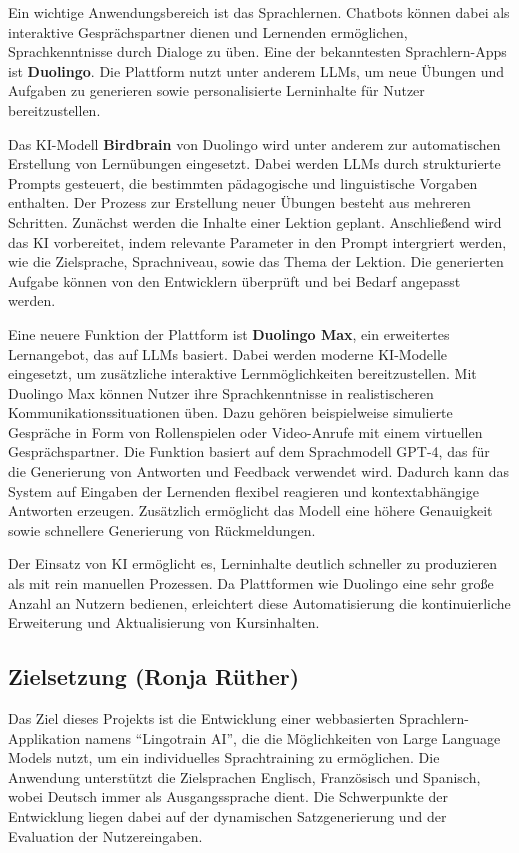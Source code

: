 Ein wichtige Anwendungsbereich ist das Sprachlernen. Chatbots können dabei als interaktive Gesprächspartner dienen und Lernenden ermöglichen, Sprachkenntnisse durch Dialoge zu üben.
Eine der bekanntesten Sprachlern-Apps ist \textbf{Duolingo}. Die Plattform nutzt unter anderem LLMs, um neue Übungen und Aufgaben zu generieren sowie personalisierte Lerninhalte für Nutzer 
bereitzustellen.\parencite{Duolingo_KI}

Das KI-Modell \textbf{Birdbrain} von Duolingo wird unter anderem zur automatischen Erstellung von Lernübungen eingesetzt.
Dabei werden LLMs durch strukturierte Prompts gesteuert, die bestimmten pädagogische und linguistische Vorgaben enthalten.
Der Prozess zur Erstellung neuer Übungen besteht aus mehreren Schritten. Zunächst werden die Inhalte einer Lektion geplant. 
Anschließend wird das KI vorbereitet, indem relevante Parameter in den Prompt intergriert werden, wie die Zielsprache, Sprachniveau, sowie das Thema der Lektion.
Die generierten Aufgabe können von den Entwicklern überprüft und bei Bedarf angepasst werden.\parencite{Duolingo_KI}

Eine neuere Funktion der Plattform ist \textbf{Duolingo Max}, ein erweitertes Lernangebot, das auf LLMs basiert. Dabei werden moderne KI-Modelle eingesetzt,
um zusätzliche interaktive Lernmöglichkeiten bereitzustellen.
Mit Duolingo Max können Nutzer ihre Sprachkenntnisse in realistischeren Kommunikationssituationen üben. Dazu gehören beispielweise simulierte Gespräche in Form von 
Rollenspielen oder Video-Anrufe mit einem virtuellen Gesprächspartner.
Die Funktion basiert auf dem Sprachmodell GPT-4, das für die Generierung von Antworten und Feedback verwendet wird.
Dadurch kann das System auf Eingaben der Lernenden flexibel reagieren und kontextabhängige Antworten erzeugen. 
Zusätzlich ermöglicht das Modell eine höhere Genauigkeit sowie schnellere Generierung von Rückmeldungen. \parencite{Duolingo_Max}

Der Einsatz von KI ermöglicht es, Lerninhalte deutlich schneller zu produzieren als mit rein manuellen Prozessen.
Da Plattformen wie Duolingo eine sehr große Anzahl an Nutzern bedienen, erleichtert diese Automatisierung die kontinuierliche Erweiterung und
Aktualisierung von Kursinhalten.

\subsection{Zielsetzung (Ronja Rüther)}
Das Ziel dieses Projekts ist die Entwicklung einer webbasierten Sprachlern-Applikation namens \enquote{Lingotrain AI}, die
die Möglichkeiten von Large Language Models nutzt, um ein individuelles Sprachtraining zu ermöglichen. Die Anwendung 
unterstützt die Zielsprachen Englisch, Französisch und Spanisch, wobei Deutsch immer als Ausgangssprache dient. 
Die Schwerpunkte der Entwicklung liegen dabei auf der dynamischen Satzgenerierung und der Evaluation der Nutzereingaben.

